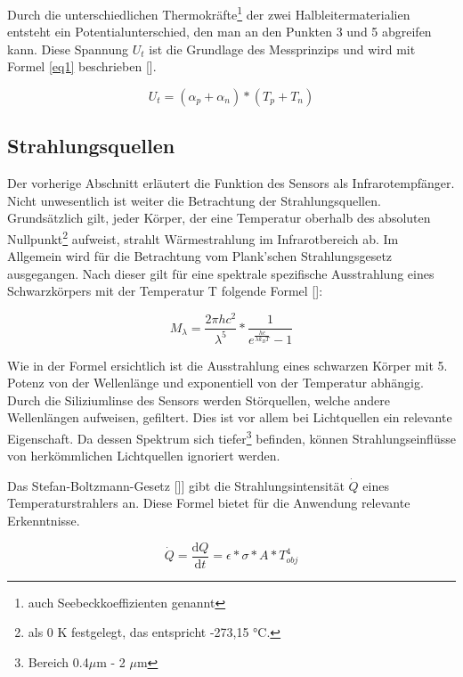 Durch die unterschiedlichen Thermokräfte\footnote[3]{auch Seebeckkoeffizienten genannt} der zwei Halbleitermaterialien entsteht ein Potentialunterschied, den man an den Punkten 3 und 5 abgreifen kann. Diese Spannung $U_{t}$ ist die Grundlage des Messprinzips und wird mit Formel \ref{eq1} beschrieben [\protect\cite{AMG8834}].

\begin{equation}
\label{eq1}
U_{t} = (\alpha_{p} + \alpha_{n})*(T_{p}+T_{n})
\end{equation}

\subsection{Strahlungsquellen}
\label{subsec:Strahlungstheorie}
Der vorherige Abschnitt erläutert die Funktion des Sensors als Infrarotempfänger. Nicht unwesentlich ist weiter die Betrachtung der Strahlungsquellen. Grundsätzlich gilt, jeder Körper, der eine Temperatur oberhalb des absoluten Nullpunkt\footnote[3]{als 0 K festgelegt, das entspricht -273,15 °C.} aufweist, strahlt Wärmestrahlung im Infrarotbereich ab. Im Allgemein wird für die Betrachtung vom Plank'schen Strahlungsgesetz ausgegangen. Nach dieser gilt für eine spektrale spezifische Ausstrahlung eines Schwarzkörpers mit der Temperatur T folgende Formel [\protect\cite{Thermoformeln}]: 

\begin{equation}
\label{eq2}
M_{\lambda } = \frac{2\pi h c^2 }{\lambda^5}*\frac{1}{e^\frac{hc}{\lambda k_{B} T}-1}
\end{equation}

Wie in der Formel ersichtlich ist die Ausstrahlung eines schwarzen Körper mit 5. Potenz von der Wellenlänge und exponentiell von der Temperatur abhängig. Durch die Siliziumlinse des Sensors werden Störquellen, welche andere Wellenlängen aufweisen, gefiltert. Dies ist vor allem bei Lichtquellen ein relevante Eigenschaft. Da dessen Spektrum sich tiefer\footnote[4]{Bereich 0.4$\mu$m - 2 $\mu$m} befinden, können Strahlungseinflüsse von herkömmlichen Lichtquellen ignoriert werden.

Das Stefan-Boltzmann-Gesetz []\protect\cite{Thermoformeln}] gibt die Strahlungsintensität $\dot{Q}$ eines Temperaturstrahlers an. Diese Formel bietet für die Anwendung relevante Erkenntnisse.

\begin{equation}
\label{eq3}
\dot{Q} = \frac{\mathrm{d} Q}{\mathrm{d} t} = \epsilon *\sigma * A * T_{obj}^4
\end{equation}


